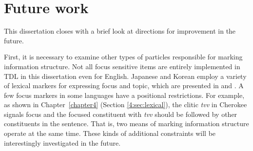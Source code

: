 \section{Future work}
\label{15:sec:future}

This dissertation closes with a brief look at directions for
improvement in the future. 





First, it is necessary to examine other types of particles responsible
for marking information structure.  Not all focus sensitive items are
entirely implemented in TDL in this dissertation even for
English. Japanese and Korean employ a variety of lexical markers for
expressing focus and topic, which are presented in \citet{hasegawa:11}
and \citet{lee:04}. A few focus markers in some languages have a
positional restrictions. For example, as shown in
Chapter~\ref{chapter4} (Section \ref{4:sec:lexical}), the clitic \textit{tvv}
in Cherokee signals focus and the focused constituent with
\textit{tvv} should be followed by other constituents in the
sentence. That is, two means of marking information structure operate
at the same time. These kinds of additional constraints will be
interestingly investigated in the future.


